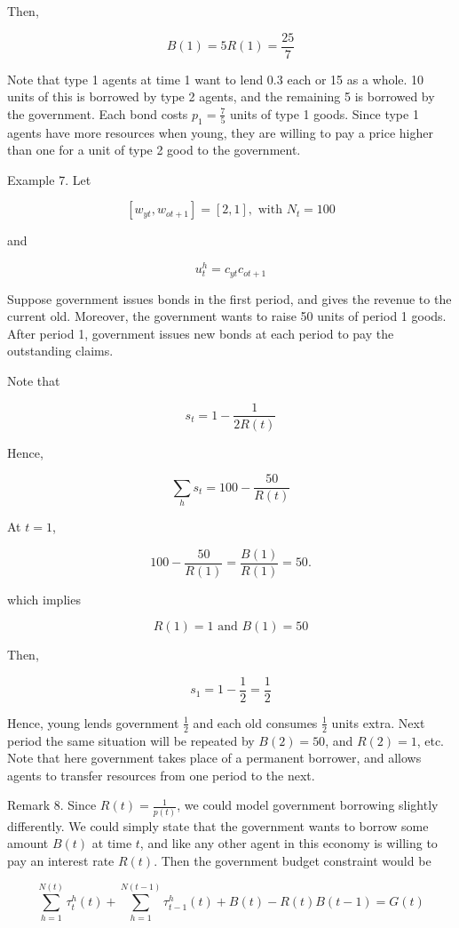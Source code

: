 \documentclass[10pt]{article}
\begin{document}
Then,

$$
B(1)=5 R(1)=\frac{25}{7}
$$

Note that type 1 agents at time 1 want to lend 0.3 each or 15 as a whole. 10 units of this is borrowed by type 2 agents, and the remaining 5 is borrowed by the government. Each bond costs $p_{1}=\frac{7}{5}$ units of type 1 goods. Since type 1 agents have more resources when young, they are willing to pay a price higher than one for a unit of type 2 good to the government.

Example 7. Let

$$
\left[w_{y t}, w_{o t+1}\right]=[2,1], \text { with } N_{t}=100
$$

and

$$
u_{t}^{h}=c_{y t} c_{o t+1}
$$

Suppose government issues bonds in the first period, and gives the revenue to the current old. Moreover, the government wants to raise 50 units of period 1 goods. After period 1, government issues new bonds at each period to pay the outstanding claims.

Note that

$$
s_{t}=1-\frac{1}{2 R(t)}
$$

Hence,

$$
\sum_{h} s_{t}=100-\frac{50}{R(t)}
$$

At $t=1$,

$$
100-\frac{50}{R(1)}=\frac{B(1)}{R(1)}=50 .
$$

which implies

$$
R(1)=1 \text { and } B(1)=50
$$

Then,

$$
s_{1}=1-\frac{1}{2}=\frac{1}{2}
$$

Hence, young lends government $\frac{1}{2}$ and each old consumes $\frac{1}{2}$ units extra. Next period the same situation will be repeated by $B(2)=50$, and $R(2)=1$, etc. Note that here government takes place of a permanent borrower, and allows agents to transfer resources from one period to the next.

Remark 8. Since $R(t)=\frac{1}{p(t)}$, we could model government borrowing slightly differently. We could simply state that the government wants to borrow some amount $B(t)$ at time $t$, and like any other agent in this economy is willing to pay an interest rate $R(t)$. Then the government budget constraint would be

$$
\sum_{h=1}^{N(t)} \tau_{t}^{h}(t)+\sum_{h=1}^{N(t-1)} \tau_{t-1}^{h}(t)+B(t)-R(t) B(t-1)=G(t)
$$
\end{document}
